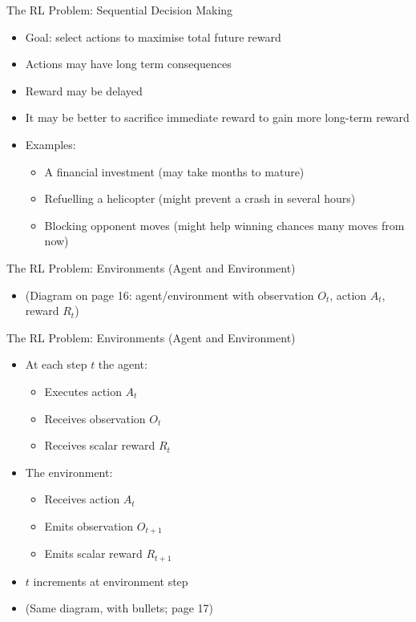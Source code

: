 \documentclass[presentation]{beamer}
\begin{document}
\begin{frame}[label={sec:orge189130}]{The RL Problem: Sequential Decision Making}
\begin{itemize}
\item Goal: select actions to maximise total future reward
\item Actions may have long term consequences
\item Reward may be delayed
\item It may be better to sacrifice immediate reward to gain more long-term reward
\item Examples:
\begin{itemize}
\item A financial investment (may take months to mature)
\item Refuelling a helicopter (might prevent a crash in several hours)
\item Blocking opponent moves (might help winning chances many moves from now)
\end{itemize}
\end{itemize}
\end{frame}
\begin{frame}[label={sec:org69c39da}]{The RL Problem: Environments (Agent and Environment)}
\begin{itemize}
\item (Diagram on page 16: agent/environment with observation \(O_t\), action \(A_t\), reward \(R_t\))
\end{itemize}
\end{frame}
\begin{frame}[label={sec:org6bf0261}]{The RL Problem: Environments (Agent and Environment)}
\begin{itemize}
\item At each step \(t\) the agent:
\begin{itemize}
\item Executes action \(A_t\)
\item Receives observation \(O_t\)
\item Receives scalar reward \(R_t\)
\end{itemize}
\item The environment:
\begin{itemize}
\item Receives action \(A_t\)
\item Emits observation \(O_{t+1}\)
\item Emits scalar reward \(R_{t+1}\)
\end{itemize}
\item \(t\) increments at environment step
\item (Same diagram, with bullets; page 17)
\end{itemize}
\end{frame}
\end{document}
